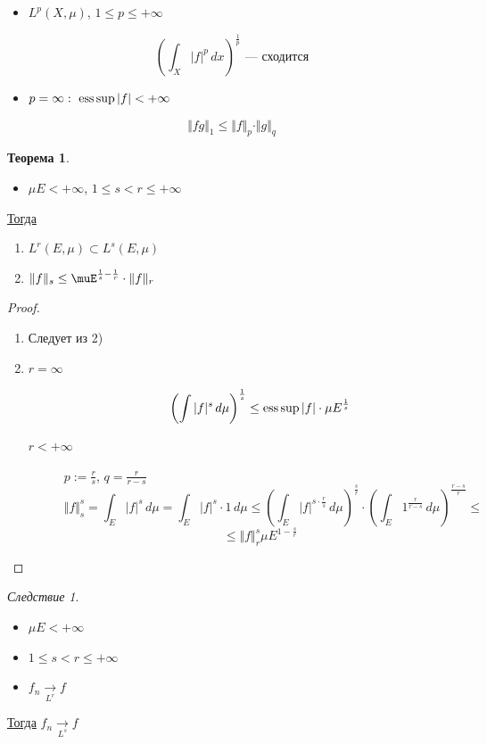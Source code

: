 \documentclass[english]{article}
\theoremstyle{plain}
\theoremstyle{remark}
\newtheorem{corollary}{Следствие}[theorem]
\theoremstyle{definition}
\newtheorem{theorem}{Теорема}[section]
\begin{document}
\begin{itemize}
\item \(L^p(X, \mu)\), \(1 \le p \le +\infty\)
\end{itemize}
\[ \left(\int_X |f|^p\,dx\right)^{\frac{1}{p}}\text{ --- сходится} \]
\begin{itemize}
\item \(p = \infty:\ \mathop{\rm ess\,sup}\limits |f| < +\infty\)
\end{itemize}
\[ \Vert fg \Vert_1 \le \Vert f \Vert_p \cdot \Vert g \Vert_q\]
\begin{theorem}
\-
\begin{itemize}
\item \(\mu E < +\infty\), \(1 \le s < r \le +\infty\)
\end{itemize}
\uline{Тогда}
\begin{enumerate}
\item \(L^r(E, \mu) \subset L^s(E, \mu)\)
\item \(\Vert f \Vert_s \le \muE^{\frac{1}{s} - \frac{1}{r}}\cdot \Vert f \Vert_r\)
\end{enumerate}
\end{theorem}
\begin{proof}
\-
\begin{enumerate}
\item Следует из 2)
\item \begin{description}
\item[{\(r = \infty\)}] \[\left(\int |f|^s\,d\mu\right)^{\frac{1}{s}} \le \mathop{\rm ess\,sup}\limits |f| \cdot \mu E^{\frac{1}{s}}\]
\item[{\(r < +\infty\)}] \(p := \frac{r}{s}\), \(q = \frac{r}{r - s}\)
\[ \Vert f \Vert_s^s = \int_E |f|^s \,d\mu = \int_E |f|^s\cdot 1 \, d\mu \le \left(\int_E |f|^{s \cdot \frac{r}{s}}\,d\mu\right)^{\frac{s}{r}} \cdot \left(\int_E 1^{\frac{r}{r - s}}\,d\mu\right)^{\frac{r - s}{r}} \le \]
\[ \le \Vert f \Vert_r^s \mu E^{1 - \frac{s}{r}} \]
\end{description}
\end{enumerate}
\end{proof}
\begin{corollary}
\-
\begin{itemize}
\item \(\mu E < +\infty\)
\item \(1 \le s < r \le +\infty\)
\item \(f_n \xrightarrow[L^r]{} f\)
\end{itemize}
\uline{Тогда} \(f_n \xrightarrow[L^s]{} f\)
\end{corollary}
\end{document}
